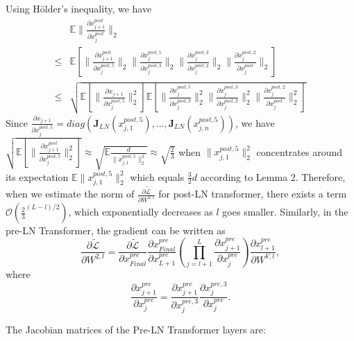 \documentclass{article}
\begin{document}
Using H\"{o}lder's inequality, we have
\begin{align}
&\mathbb{E}\|\frac{\partial x_{j+1}^{post}}{\partial x_j^{post}}\|_2\nonumber\\
\leq&
\mathbb{E}\left[\|\frac{\partial x_{j+1}^{post}}{\partial x_j^{post,5}}\|_2\|\frac{\partial x_{j}^{post,5}}{\partial x_j^{post,3}}\|_2\|\frac{\partial x_{j}^{post,3}}{\partial x_j^{post,2}}\|_2\|\frac{\partial x_{j}^{post,2}}{\partial x_j^{post}}\|_2\right]\\
\leq&\sqrt{\mathbb{E}\left[\|\frac{\partial x_{j+1}}{\partial x_j^{post,5}}\|_2^2\right]\mathbb{E}\left[\|\frac{\partial x_{j}^{post,5}}{\partial x_j^{post,3}}\|_2^2\|\frac{\partial x_{j}^{post,3}}{\partial x_j^{post,2}}\|_2^2\|\frac{\partial x_{j}^{post,2}}{\partial x_j^{post}}\|_2^2\right]}
\end{align}
Since $\frac{\partial x_{j+1}}{\partial x_j^{post,5}}=diag(\mathbf{J}_{LN}(x_{j,1}^{post,5}),...,\mathbf{J}_{LN}(x_{j,n}^{post,5}))$, we have $\sqrt{\mathbb{E}\left[\|\frac{\partial x_{j+1}^{post}}{\partial x_j^{post,5}}\|_2^2\right]} \approx \sqrt{\mathbb{E}\frac{d}{\|x_{j,1}^{post,5}\|^2_2}} \approx \sqrt{\frac{2}{3}}$ when $\|x_{j,1}^{post,5}\|^2_2$ concentrates around its expectation $\mathbb{E}\|x_{j,1}^{post,5}\|^2_2$ which equals $\frac{3}{2}d$ according to Lemma 2. Therefore, when we estimate the norm of $\frac{\partial \tilde{\mathcal{L}}}{\partial W^{2,l}}$ for post-LN transformer, there exists a term $\mathcal{O}(\frac{2}{3}^{(L-l)/2})$, which exponentially decreases as $l$ goes smaller. Similarly, in the pre-LN Transformer, the gradient can be written as
$$\frac{\partial \tilde{\mathcal{L}}}{\partial W^{2,l}}=\frac{\partial \tilde{\mathcal{L}}}{\partial x^{pre}_{Final}}\frac{\partial x^{pre}_{Final}}{\partial x^{pre}_{L+1}}(\prod_{j=l+1}^{L}\frac{\partial x^{pre}_{j+1}}{\partial x^{pre}_j})\frac{\partial x^{pre}_{l+1}}{\partial W^{V,l}},$$ where $$ \frac{\partial x^{pre}_{j+1}}{\partial x^{pre}_j}=
\frac{\partial x^{pre}_{j+1}}{\partial x_j^{pre,3}}\frac{\partial x_{j}^{pre,3}}{\partial x_j^{pre}}.
$$ 



The Jacobian matrices of the Pre-LN Transformer layers are:
\end{document}

